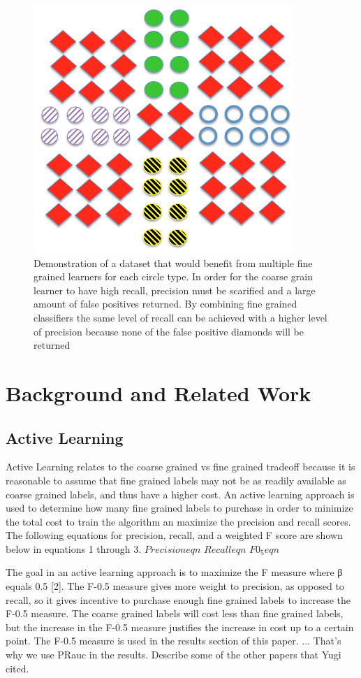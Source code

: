 \documentclass[ms]{nuthesis}
\begin{document}
\FloatBarrier
\begin{figure}[!htb]
	\centering
    \includegraphics[width=0.5\columnwidth]{fig/union}
    \caption{Demonstration of a dataset that would benefit from multiple fine grained
    learners for each circle type. In order for the coarse grain learner to have high
    recall, precision must be scarified and a large amount of false positives returned.
    By combining fine grained classifiers the same level of recall can be achieved with a
    higher level of precision because none of the false positive diamonds will be returned}
    \label{fig:union}
\end{figure}
\FloatBarrier


\chapter{Background and Related Work}
\section{Active Learning}
\par Active Learning relates to the coarse grained vs fine grained tradeoff because it is
reasonable to assume that fine grained labels may not be as readily available as coarse grained
labels, and thus have a higher cost. An active learning approach is used to determine how
many fine grained labels to purchase in order to minimize the total cost to train the
algorithm an maximize the precision and recall scores. The following equations for
precision, recall, and a weighted F score are shown below in equations 1 through 3.
\break
$Precision eqn$ \break
$Recall eqn$ \break
$F0_5 eqn$ \break
\break
\par The goal in an active learning approach is to maximize the F measure where β equals 0.5 [2].
The F-0.5 measure gives more weight to precision, as opposed to recall, so it gives
incentive to purchase enough fine grained labels to increase the F-0.5 measure. The
coarse grained labels will cost less than fine grained labels, but the increase in
the F-0.5 measure justifies the increase in cost up to a certain point. The F-0.5
measure is used in the results section of this paper. ... That's why we use PRauc in the results.
Describe some of the other papers that Yugi cited.
\end{document}
